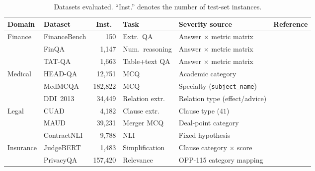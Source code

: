 \documentclass[11pt]{article}
\begin{document}
\begin{table}[t]
\centering
\footnotesize
\setlength{\tabcolsep}{4pt}
\begin{tabular}{@{}llrlll@{}}
\toprule
Domain & Dataset & Inst.\ & Task & Severity source & Reference \\
\midrule
\multirow{3}{*}{Finance}
  & FinanceBench  & 150        & Extr.\ QA          & Answer $\times$ metric matrix       & \citet{islam2023financebench} \\
  & FinQA         & 1{,}147    & Num.\ reasoning    & Answer $\times$ metric matrix       & \citet{chen2021finqa} \\
  & TAT-QA        & 1{,}663    & Table+text QA      & Answer $\times$ metric matrix       & \citet{zhu2021tatqa} \\
\midrule
\multirow{3}{*}{Medical}
  & HEAD-QA       & 12{,}751   & MCQ                & Academic category                   & \citet{vilares2019headqa} \\
  & MedMCQA       & 182{,}822  & MCQ                & Specialty (\texttt{subject\_name})  & \citet{pal2022medmcqa} \\
  & DDI~2013      & 34{,}449   & Relation extr.   & Relation type (effect/advice)       & \citet{herrerozazo2013ddi} \\
\midrule
\multirow{3}{*}{Legal}
  & CUAD          & 4{,}182    & Clause extr.\      & Clause type ($41$)                  & \citet{hendrycks2021cuad} \\
  & MAUD          & 39{,}231   & Merger MCQ         & Deal-point category                 & \citet{wang2023maud} \\
  & ContractNLI   & 9{,}788    & NLI                & Fixed hypothesis                    & \citet{koreeda2021contractnli} \\
\midrule
\multirow{2}{*}{Insurance}
  & JudgeBERT     & 1{,}483    & Simplification     & Clause category $\times$ score      & \citet{beauchemin2025thesis} \\
  & PrivacyQA     & 157{,}420  & Relevance     & OPP-115 category mapping            & \citet{ravichander2019privacyqa} \\
\bottomrule
\end{tabular}
\caption{Datasets evaluated. \enquote{Inst.} denotes the number of
test-set instances.}
\label{tab:datasets}
\vspace{-1em}
\end{table}

\end{document}
